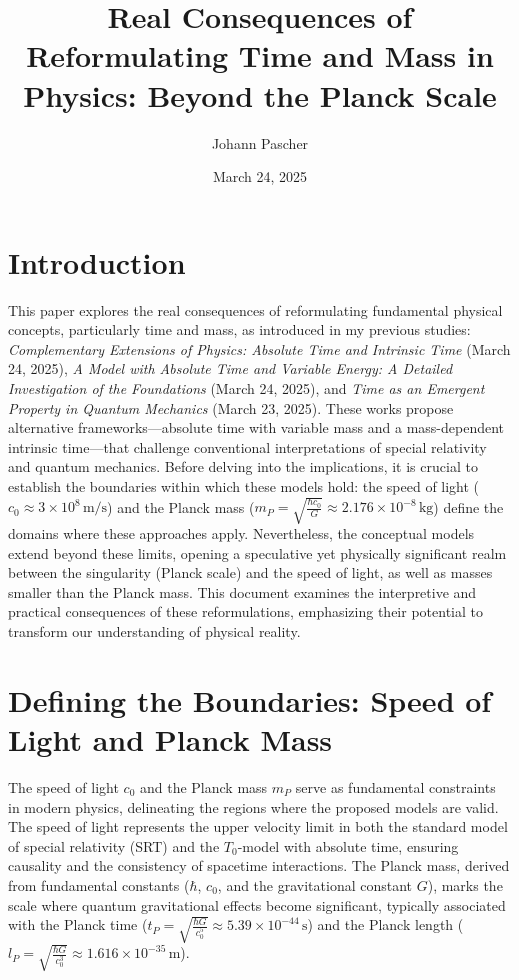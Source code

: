 \documentclass[a4paper,12pt]{article}
\begin{document}
	
	\title{Real Consequences of Reformulating Time and Mass in Physics: Beyond the Planck Scale}
	\author{Johann Pascher}
	\date{March 24, 2025}
	\maketitle
	
	\tableofcontents %
	\newpage %
	
	\section{Introduction}
	This paper explores the real consequences of reformulating fundamental physical concepts, particularly time and mass, as introduced in my previous studies: \textit{Complementary Extensions of Physics: Absolute Time and Intrinsic Time} (March 24, 2025), \textit{A Model with Absolute Time and Variable Energy: A Detailed Investigation of the Foundations} (March 24, 2025), and \textit{Time as an Emergent Property in Quantum Mechanics} (March 23, 2025). These works propose alternative frameworks—absolute time with variable mass and a mass-dependent intrinsic time—that challenge conventional interpretations of special relativity and quantum mechanics. Before delving into the implications, it is crucial to establish the boundaries within which these models hold: the speed of light (\( c_0 \approx 3 \times 10^8 \, \text{m/s} \)) and the Planck mass (\( m_P = \sqrt{\frac{\hbar c_0}{G}} \approx 2.176 \times 10^{-8} \, \text{kg} \)) define the domains where these approaches apply. Nevertheless, the conceptual models extend beyond these limits, opening a speculative yet physically significant realm between the singularity (Planck scale) and the speed of light, as well as masses smaller than the Planck mass. This document examines the interpretive and practical consequences of these reformulations, emphasizing their potential to transform our understanding of physical reality.
	
	\section{Defining the Boundaries: Speed of Light and Planck Mass}
	The speed of light \( c_0 \) and the Planck mass \( m_P \) serve as fundamental constraints in modern physics, delineating the regions where the proposed models are valid. The speed of light represents the upper velocity limit in both the standard model of special relativity (SRT) and the \( T_0 \)-model with absolute time, ensuring causality and the consistency of spacetime interactions. The Planck mass, derived from fundamental constants (\( \hbar \), \( c_0 \), and the gravitational constant \( G \)), marks the scale where quantum gravitational effects become significant, typically associated with the Planck time (\( t_P = \sqrt{\frac{\hbar G}{c_0^5}} \approx 5.39 \times 10^{-44} \, \text{s} \)) and the Planck length (\( l_P = \sqrt{\frac{\hbar G}{c_0^3}} \approx 1.616 \times 10^{-35} \, \text{m} \)).
	
\end{document}
